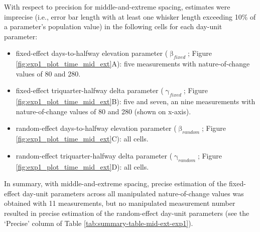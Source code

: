 \documentclass[
12pt, %
twoside,
english]{guelphthesis}
\begin{document}
With respect to precision for middle-and-extreme spacing, estimates were imprecise (i.e., error bar length with at least one whisker length exceeding 10\% of a parameter's population value) in the following cells for each day-unit parameter:
\begin{itemize}
\tightlist
\item
  fixed-effect days-to-halfway elevation parameter (\(\upbeta_{fixed}\); Figure \ref{fig:exp1_plot_time_mid_ext}A): five measurements with nature-of-change values of 80 and 280.
\item
  fixed-effect triquarter-halfway delta parameter (\(\upgamma_{fixed}\); Figure \ref{fig:exp1_plot_time_mid_ext}B): five and seven, an nine measurements with nature-of-change values of 80 and 280 (shown on x-axis).
\item
  random-effect days-to-halfway elevation parameter (\(\upbeta_{random}\); Figure \ref{fig:exp1_plot_time_mid_ext}C): all cells.
\item
  random-effect triquarter-halfway delta parameter (\(\upgamma_{random}\); Figure \ref{fig:exp1_plot_time_mid_ext}D): all cells.
\end{itemize}
\noindent In summary, with middle-and-extreme spacing, precise estimation of the fixed-effect day-unit parameters across all manipulated nature-of-change values was obtained with 11 measurements, but no manipulated measurement number resulted in precise estimation of the random-effect day-unit parameters (see the `Precise' column of Table \ref{tab:summary-table-mid-ext-exp1}).
\end{document}
